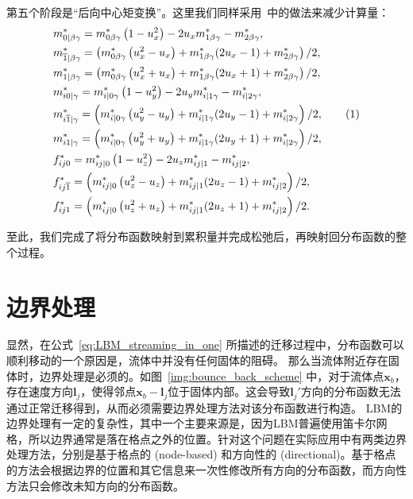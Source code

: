 第五个阶段是“后向中心矩变换”。这里我们同样采用~\cite{Geier-2015}中的做法来减少计算量：
\begin{align*}
    & m_{0 \mid \beta \gamma}^{*}=m_{0 \beta \gamma}^{*}\left(1-u_x^{2}\right)-2u_x m_{1 \beta \gamma}^{*}-m_{2 \beta \gamma}^{*}, \\
    & m_{\overline{1} \mid \beta \gamma}^{*}=\left(m_{0 \beta \gamma}^{*}\left(u_x^{2}-u_x\right)+m_{1 \beta \gamma}^{*}(2 u_x-1)+m_{2 \beta \gamma}^{*}\right) / 2, \\
    & m_{1 \mid \beta \gamma}^{*}=\left(m_{0 \beta \gamma}^{*}\left(u_x^{2}+u_x\right)+m_{1 \beta \gamma}^{*}(2 u_x+1)+m_{2 \beta \gamma}^{*}\right) / 2, \\
    & m_{i 0 \mid \gamma}^{*}=m_{i \mid 0 \gamma}^{*}\left(1-u_y^{2}\right)-2u_y m_{i \mid 1 \gamma}^{*}-m_{i \mid 2 \gamma}^{*}, \\
    & m_{i \overline{1} \mid \gamma}^{*}=\left(m_{i \mid 0 \gamma}^{*}\left(u_y^{2}-u_y\right)+m_{i \mid 1 \gamma}^{*}(2 u_y-1)+m_{i \mid 2 \gamma}^{*}\right) / 2, \stepcounter{equation}\tag{\theequation} \\
    & m_{i 1 \mid \gamma}^{*}=\left(m_{i \mid 0 \gamma}^{*}\left(u_y^{2}+u_y\right)+m_{i \mid 1 \gamma}^{*}(2 u_y+1)+m_{i \mid 2 \gamma}^{*}\right) / 2, \\
    & f_{i j 0}^{*}=m_{i j \mid 0}^{*}\left(1-u_z^{2}\right)-2u_z m_{i j \mid 1}^{*}-m_{i j \mid 2}^{*}, \\
    & f_{i j \overline{1}}^{*}=\left(m_{i j \mid 0}^{*}\left(u_z^{2}-u_z\right)+m_{i j \mid 1}^{*}(2 u_z-1)+m_{i j \mid 2}^{*}\right) / 2, \\
    & f_{i j 1}^{*}=\left(m_{i j \mid 0}^{*}\left(u_z^{2}+u_z\right)+m_{i j \mid 1}^{*}(2 u_z+1)+m_{i j \mid 2}^{*}\right) / 2 .
\end{align*}

至此，我们完成了将分布函数映射到累积量并完成松弛后，再映射回分布函数的整个过程。
    

\section{边界处理}
\label{sec:boundary_treatment}
显然，在公式~\ref{eq:LBM_streaming_in_one} 所描述的迁移过程中，分布函数可以顺利移动的一个原因是，流体中并没有任何固体的阻碍。
那么当流体附近存在固体时，边界处理是必须的。如图~\ref{img:bounce_back_scheme} 中，对于流体点$\bm{x}_b$，存在速度方向$\bm{l}_j$，使得邻点$\bm{x}_b-\bm{l}_j$位于固体内部。这会导致$\bm{l}_j'$方向的分布函数无法通过正常迁移得到，从而必须需要边界处理方法对该分布函数进行构造。
LBM的边界处理有一定的复杂性，其中一个主要来源是，因为LBM普遍使用笛卡尔网格，所以边界通常是落在格点之外的位置。针对这个问题在实际应用中有两类边界处理方法，分别是基于格点的 (node-based) 和方向性的 (directional)。基于格点的方法会根据边界的位置和其它信息来一次性修改所有方向的分布函数，而方向性方法只会修改未知方向的分布函数。


